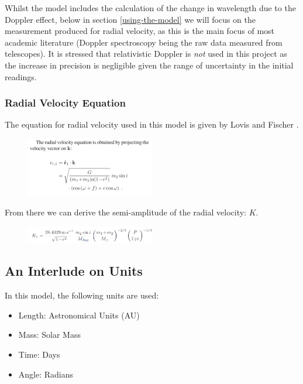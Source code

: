 \documentclass[11pt]{article}
\begin{document}
Whilst the model includes the calculation of the change in wavelength
due to the Doppler effect, below in section \ref{using-the-model} we will focus on the measurement produced for radial velocity, as this is the main focus of most academic literature (Doppler spectroscopy being the raw data measured from telescopes). It is stressed that relativistic Doppler is \emph{not} used in this project as the increase in precision is negligible given the range of uncertainty in the initial readings.

\hypertarget{radial-velocity-equation}{%
\subsubsection{Radial Velocity Equation}\label{radial-velocity-equation}}

The equation for radial velocity used in this model is given by Lovis
and Fischer \parencite*{Lovis}.

\begin{figure}[H]
	\centering
	\includegraphics[width=0.5\textwidth]{../images/radial_velocity.png}
	\label{Figure 2.g}
\end{figure}

From there we can derive the semi-amplitude of the radial velocity: \(K\).

\begin{figure}[H]
   	\centering
   	\includegraphics[width=0.5\textwidth]{../images/K_star.png}
   	\label{Figure 2.h}
\end{figure}

    \hypertarget{an-interlude-on-units}{%
\subsection{An Interlude on Units}\label{an-interlude-on-units}}

In this model, the following units are used: 

\begin{itemize}
	\item Length: Astronomical Units (AU)
	\item Mass: Solar Mass
	\item Time: Days
	\item Angle: Radians
\end{itemize}
\end{document}
